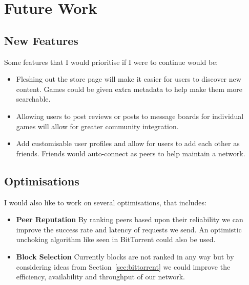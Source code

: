 \section{Future Work}

\subsection*{New Features}

Some features that I would prioritise if I were to continue would be:

\begin{itemize}
  \item Fleshing out the store page will make it easier for users to discover new content. Games could be given extra metadata to help make them more searchable.
  \item Allowing users to post reviews or posts to message boards for individual games will allow for greater community integration.
  \item Add customisable user profiles and allow for users to add each other as friends. Friends would auto-connect as peers to help maintain a network.
\end{itemize}


\subsection*{Optimisations}

I would also like to work on several optimisations, that includes:

\begin{itemize}
  \item \textbf{Peer Reputation} By ranking peers based upon their reliability we can improve the success rate and latency of requests we send. An optimistic unchoking algorithm like seen in BitTorrent could also be used.
  \item \textbf{Block Selection} Currently blocks are not ranked in any way but by considering ideas from Section~\ref{sec:bittorrent} we could improve the efficiency, availability and throughput of our network.
\end{itemize}
